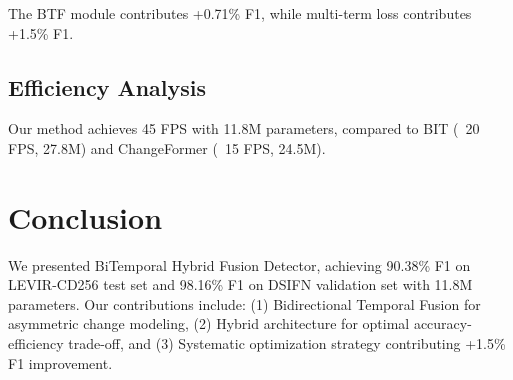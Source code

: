 \documentclass{IEEEtran}
\begin{document}
The BTF module contributes +0.71\% F1, while multi-term loss contributes +1.5\% F1.

\subsection{Efficiency Analysis}

Our method achieves 45 FPS with 11.8M parameters, compared to BIT (~20 FPS, 27.8M) and ChangeFormer (~15 FPS, 24.5M).

\section{Conclusion}
\label{sec:conclusion}

We presented BiTemporal Hybrid Fusion Detector, achieving 90.38\% F1 on LEVIR-CD256 test set and 98.16\% F1 on DSIFN validation set with 11.8M parameters. Our contributions include: (1) Bidirectional Temporal Fusion for asymmetric change modeling, (2) Hybrid architecture for optimal accuracy-efficiency trade-off, and (3) Systematic optimization strategy contributing +1.5\% F1 improvement.
\end{document}
